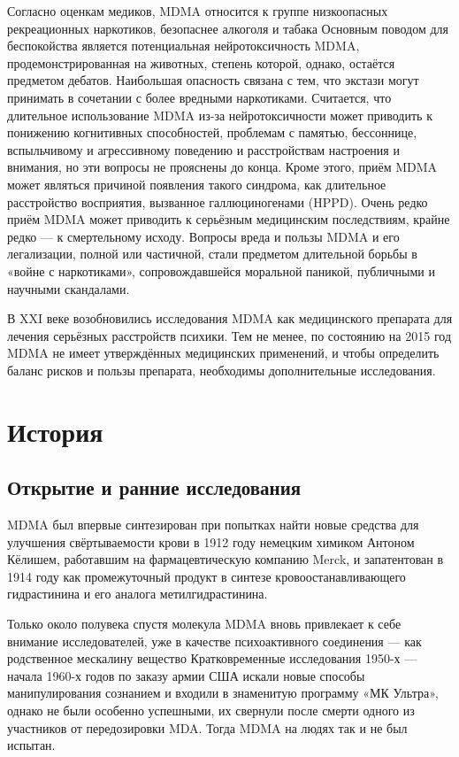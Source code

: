 \documentclass[a4paper,14pt,russian]{report}
\begin{document}
Согласно оценкам медиков, MDMA относится к группе низкоопасных рекреационных наркотиков, безопаснее алкоголя и табака Основным поводом для беспокойства является потенциальная нейротоксичность MDMA, продемонстрированная на животных, степень которой, однако, остаётся предметом дебатов. Наибольшая опасность связана с тем, что экстази могут принимать в сочетании с более вредными наркотиками. Считается, что длительное использование MDMA из-за нейротоксичности может приводить к понижению когнитивных способностей, проблемам с памятью, бессоннице, вспыльчивому и агрессивному поведению и расстройствам настроения и внимания, но эти вопросы не прояснены до конца. Кроме этого, приём MDMA может являться причиной появления такого синдрома, как длительное расстройство восприятия, вызванное галлюциногенами (HPPD). Очень редко приём MDMA может приводить к серьёзным медицинским последствиям, крайне редко — к смертельному исходу. Вопросы вреда и пользы MDMA и его легализации, полной или частичной, стали предметом длительной борьбы в «войне с наркотиками», сопровождавшейся моральной паникой, публичными и научными скандалами.

В XXI веке возобновились исследования MDMA как медицинского препарата для лечения серьёзных расстройств психики. Тем не менее, по состоянию на 2015 год MDMA не имеет утверждённых медицинских применений, и чтобы определить баланс рисков и пользы препарата, необходимы дополнительные исследования.

\section{История}

\subsection{Открытие и ранние исследования}

MDMA был впервые синтезирован при попытках найти новые средства для улучшения свёртываемости крови в 1912 году немецким химиком Антоном Кёлишем, работавшим на фармацевтическую компанию Merck, и запатентован в 1914 году как промежуточный продукт в синтезе кровоостанавливающего гидрастинина и его аналога метилгидрастинина.

Только около полувека спустя молекула MDMA вновь привлекает к себе внимание исследователей, уже в качестве психоактивного соединения — как родственное мескалину вещество Кратковременные исследования 1950-х — начала 1960-х годов по заказу армии США искали новые способы манипулирования сознанием и входили в знаменитую программу «МК Ультра», однако не были особенно успешными, их свернули после смерти одного из участников от передозировки MDA. Тогда MDMA на людях так и не был испытан.
\end{document}
